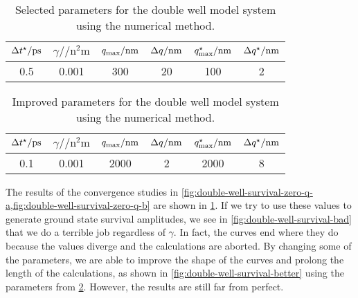 \begin{table}[h]
	\begin{center}
	\begin{tabular}{ c c c c c c }
		\toprule
		{$\dt\alt / \si{\pico\second}$} & {$\gamma / \si{\per\square\nano\meter}$} & {$q_\mathrm{max} / \si{\nano\meter}$} & {$\Delta q / \si{\nano\meter}$} & {$q_\mathrm{max}^\star / \si{\nano\meter}$} & {$\Delta q^\star / \si{\nano\meter}$} \\
		\midrule
		0.5 & 0.001 & 300 & 20 & 100 & 2 \\
		\bottomrule
	\end{tabular}
	\end{center}
	\caption[
		Selected parameters for double well (numerical)
	]{
		Selected parameters for the double well model system using the numerical method.
	}
	\label{tab:model-sa0-double-well}
\end{table}

\begin{table}[h]
	\begin{center}
	\begin{tabular}{ c c c c c c }
		\toprule
		{$\dt\alt / \si{\pico\second}$} & {$\gamma / \si{\per\square\nano\meter}$} & {$q_\mathrm{max} / \si{\nano\meter}$} & {$\Delta q / \si{\nano\meter}$} & {$q_\mathrm{max}^\star / \si{\nano\meter}$} & {$\Delta q^\star / \si{\nano\meter}$} \\
		\midrule
		0.1 & 0.001 & 2000 & 2 & 2000 & 8 \\
		\bottomrule
	\end{tabular}
	\end{center}
	\caption[
		Improved parameters for double well (numerical)
	]{
		Improved parameters for the double well model system using the numerical method.
	}
	\label{tab:model-sas-double-well}
\end{table}

The results of the convergence studies in \cref{fig:double-well-survival-zero-q-a,fig:double-well-survival-zero-q-b} are shown in \cref{tab:model-sa0-double-well}.
If we try to use these values to generate ground state survival amplitudes, we see in \cref{fig:double-well-survival-bad} that we do a terrible job regardless of $\gamma$.
In fact, the curves end where they do because the values diverge and the calculations are aborted.
By changing some of the parameters, we are able to improve the shape of the curves and prolong the length of the calculations, as shown in \cref{fig:double-well-survival-better} using the parameters from \cref{tab:model-sas-double-well}.
However, the results are still far from perfect.

